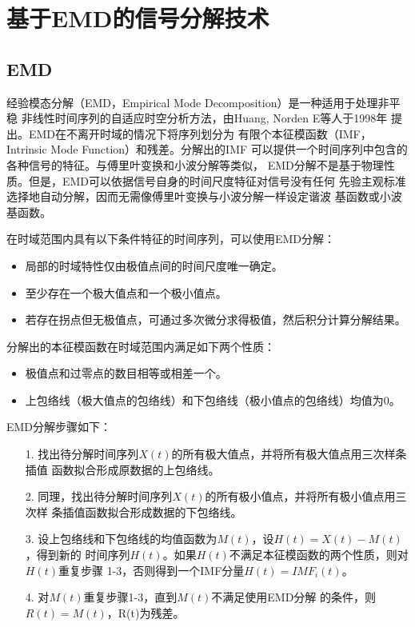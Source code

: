 \documentclass[AutoFakeBold]{LZUThesis}
\begin{document}
\section{基于EMD的信号分解技术}
\subsection{EMD}
经验模态分解（EMD，Empirical Mode Decomposition）是一种适用于处理非平稳
非线性时间序列的自适应时空分析方法，由Huang, Norden E等人于1998年
提出。EMD在不离开时域的情况下将序列划分为
有限个本征模函数（IMF，Intrinsic Mode Function）和残差。分解出的IMF
可以提供一个时间序列中包含的各种信号的特征。与傅里叶变换和小波分解等类似，
EMD分解不是基于物理性质。但是，EMD可以依据信号自身的时间尺度特征对信号没有任何
先验主观标准选择地自动分解，因而无需像傅里叶变换与小波分解一样设定谐波
基函数或小波基函数。

在时域范围内具有以下条件特征的时间序列，可以使用EMD分解：
\begin{itemize}
\item 局部的时域特性仅由极值点间的时间尺度唯一确定。
\item 至少存在一个极大值点和一个极小值点。
\item 若存在拐点但无极值点，可通过多次微分求得极值，然后积分计算分解结果。
\end{itemize}

分解出的本征模函数在时域范围内满足如下两个性质：
\begin{itemize}
\item 极值点和过零点的数目相等或相差一个。
\item 上包络线（极大值点的包络线）和下包络线（极小值点的包络线）均值为0。
\end{itemize}

EMD分解步骤如下：
\begin{itemize}
\item[1. ] 找出待分解时间序列$X(t)$的所有极大值点，并将所有极大值点用三次样条插值
函数拟合形成原数据的上包络线。
\item[2. ] 同理，找出待分解时间序列$X(t)$的所有极小值点，并将所有极小值点用三次样
条插值函数拟合形成数据的下包络线。
\item[3. ] 设上包络线和下包络线的均值函数为$M(t)$，设$H(t)=X(t)-M(t)$，得到新的
时间序列$H(t)$。如果$H(t)$不满足本征模函数的两个性质，则对$H(t)$重复步骤
1-3，否则得到一个IMF分量$H(t)=IMF_i(t)$。
\item[4. ] 对$M(t)$重复步骤1-3，直到$M(t)$不满足使用EMD分解
的条件，则$R(t)=M(t)$，R(t)为残差。
\end{itemize}
\end{document}
